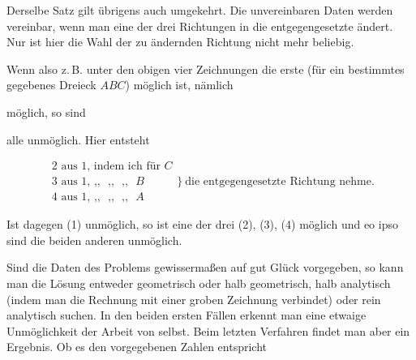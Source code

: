 Derselbe Satz gilt übrigens auch umgekehrt. Die unvereinbaren Daten werden vereinbar, wenn man eine der drei Richtungen in die entgegengesetzte ändert. Nur ist hier die Wahl der zu ändernden Richtung nicht mehr beliebig.

Wenn also z.\,B. unter den obigen vier Zeichnungen die erste (für ein bestimmtes gegebenes Dreieck $ABC$) möglich ist, nämlich

\begin{center}\end{center}

möglich, so sind

\begin{center}\quad \quad \end{center}

alle unmöglich. Hier entsteht

\[
\begin{array}{l}
\text{2 aus 1, indem ich für } C\\
\text{3 aus 1, } \text{,,} \text{ } \text{,,} \text{ } \text{,,} \text{ } B\\
\text{4 aus 1, } \text{,,} \text{ } \text{,,} \text{ } \text{,,} \text{ } A
\end{array}
\Big\}\ \text{die entgegengesetzte Richtung nehme.}
\]

Ist dagegen (1) unmöglich, so ist eine der drei (2), (3), (4) möglich und eo ipso sind die beiden anderen unmöglich.

Sind die Daten des Problems gewissermaßen auf gut Glück vorgegeben, so kann man die Lösung entweder geometrisch oder halb geometrisch, halb analytisch (indem man die Rechnung mit einer groben Zeichnung verbindet) oder rein analytisch suchen. In den beiden ersten Fällen erkennt man eine etwaige Unmöglichkeit  der Arbeit von selbst. Beim letzten Verfahren findet man aber  ein Ergebnis. Ob es den vorgegebenen Zahlen entspricht\space%
